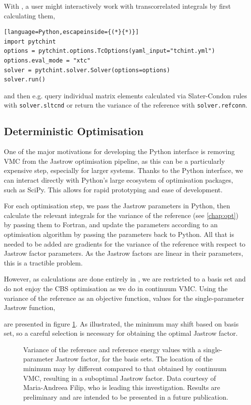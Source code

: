 With \pytchint, a user might interactively work with transcorrelated integrals by first calculating them,
\begin{lstlisting}[language=Python,escapeinside={(*}{*)}]
import pytchint
options = pytchint.options.TcOptions(yaml_input="tchint.yml")
options.eval_mode = "xtc"
solver = pytchint.solver.Solver(options=options)
solver.run()
\end{lstlisting}
and then e.g. query individual matrix elements calculated via Slater-Condon rules with \texttt{solver.sltcnd} or return the variance of the reference with \texttt{solver.refconn}.

\subsection{Deterministic Optimisation}

One of the major motivations for developing the Python interface is removing VMC from the Jastrow optimisation pipeline, as this can be a particularly expensive step, especially for larger systems. Thanks to the Python interface, we can interact directly with Python's large ecosystem of optimisation packages, such as SciPy. This allows for rapid prototyping and ease of development.

For each optimisation step, we pass the Jastrow parameters in Python, then calculate the relevant integrals for the variance of the reference (see \autoref{chap:opt}) by passing them to Fortran, and update the parameters according to an optimisation algorithm by passing the parameters back to Python. All that is needed to be added are gradients for the variance of the reference with respect to Jastrow factor parameters. As the Jastrow factors are linear in their parameters, this is a tractible problem.

However, as calculations are done entirely in \pytchint, we are restricted to a basis set and do not enjoy the \gls{CBS} optimisation as we do in continuum \gls{VMC}. Using the variance of the reference as an objective function, values for the single-parameter Jastrow function,


are presented in figure \ref{fig:det-opt}. As illustrated, the minimum may shift based on basis set, so a careful selection is necessary for obtaining the optimal Jastrow factor.

\begin{figure}[htbp]
    \centering
    \caption{Variance of the reference and reference energy values with a single-parameter Jastrow factor, for the  basis sets. The location of the minimum may by different compared to that obtained by continuum VMC, resulting in a suboptimal Jastrow factor. Data courtesy of Maria-Andreea Filip, who is leading this investigation. Results are preliminary and are intended to be presented in a future publication.}
    \label{fig:det-opt}
\end{figure}


